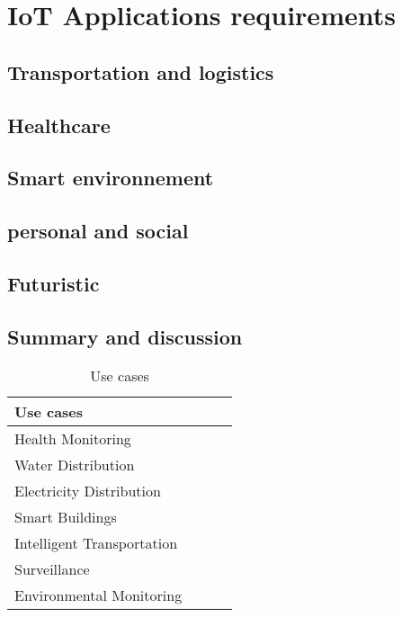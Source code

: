 \section{IoT Applications requirements} %
\label{sec:section_name}

\subsection{Transportation and logistics}
\subsection{Healthcare}
\subsection{Smart environnement}
\subsection{personal and social}
\subsection{Futuristic}
\subsection{Summary and discussion}







\begin{table}[h!]
\scriptsize
	\begin{tabular}{l|l|l|l}
	\textbf{Use cases}         &  &  & \\\hline
	Health Monitoring          &  &  & \\\hline
	Water Distribution         &  &  & \\\hline
	Electricity Distribution   &  &  & \\\hline
	Smart Buildings            &  &  & \\\hline
	Intelligent Transportation &  &  & \\\hline
	Surveillance               &  &  & \\\hline
	Environmental Monitoring   &  &  & \\
	\end{tabular}
	\caption{\label{tab:IoTUseCase} Use cases \cite{hancke_role_2012}}
\end{table}


